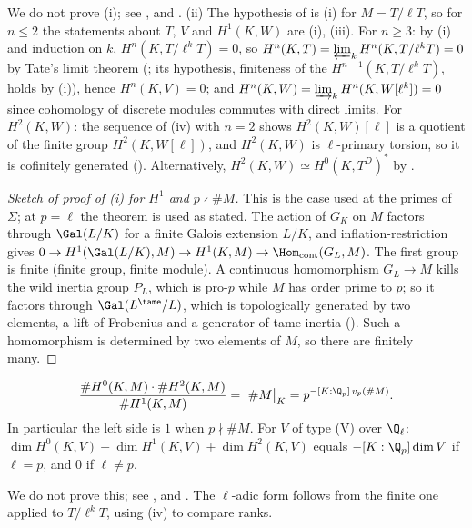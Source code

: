 \noindent We do not prove (i); see \cite[Chapter II, Section 5]{SerreGaloisCoh}, \cite[Chapter VII, Section 2]{NSW} and \cite[Chapter I, Section 2]{MilneADT}.
(ii) The hypothesis of  is (i) for $M=T/\ell T$, so for $n\le2$ the statements about $T$, $V$ and $H^1(K,W)$ are (i), (iii).
For $n\ge3$: by (i) and induction on $k$, $H^n(K,T/\ell^kT)=0$, so $H^n(K,T)=\varprojlim_kH^n(K,T/\ell^kT)=0$ by Tate's limit theorem (;
its hypothesis, finiteness of the $H^{n-1}(K,T/\ell^kT)$, holds by (i)), hence $H^n(K,V)=0$; and $H^n(K,W)=\varinjlim_kH^n(K,W[\ell^k])=0$ since cohomology of
discrete modules commutes with direct limits. For $H^2(K,W)$: the sequence of (iv) with $n=2$ shows $H^2(K,W)[\ell]$ is a quotient of the finite
group $H^2(K,W[\ell])$, and $H^2(K,W)$ is $\ell$-primary torsion, so it is cofinitely generated (). Alternatively, $H^2(K,W)\simeq H^0(K,T^D)^*$
by .

\begin{proof}[Sketch of proof of (i) for $H^1$ and $p\nmid\#M$]
This is the case used at the primes of $\Sigma$; at $p=\ell$ the theorem is used as stated. The action of $G_K$ on $M$ factors through $\Gal(L/K)$ for a finite Galois extension $L/K$, and inflation-restriction gives
$0\to H^1(\Gal(L/K),M)\to H^1(K,M)\to\Hom_{\mathrm{cont}}(G_L,M)$. The first group is finite (finite group, finite module). A continuous homomorphism $G_L\to M$ kills
the wild inertia group $P_L$, which is pro-$p$ while $M$ has order prime to $p$; so it factors through $\Gal(L^{\tame}/L)$, which is topologically generated by two
elements, a lift of Frobenius and a generator of tame inertia (). Such a homomorphism is determined by two elements of $M$, so there are finitely
many.
\end{proof}

\begin{theorem}\label{thm:galcoh:local-euler}
\[
\frac{\#H^0(K,M)\cdot\#H^2(K,M)}{\#H^1(K,M)}=\bigl|\#M\bigr|_K=p^{-[K:\Q_p]\,v_p(\#M)} .
\]
In particular the left side is $1$ when $p\nmid\#M$. For $V$ of type (V) over $\Q_\ell$: $\dim H^0(K,V)-\dim H^1(K,V)+\dim H^2(K,V)$ equals $-[K:\Q_p]\dim V$ if $\ell=p$,
and $0$ if $\ell\ne p$.
\end{theorem}

\noindent We do not prove this; see \cite[Chapter II, Section 5]{SerreGaloisCoh}, \cite[Chapter I, Section 2]{MilneADT} and \cite[Chapter VII, Section 3]{NSW}. The
$\ell$-adic form follows from the finite one applied to $T/\ell^kT$, using (iv) to compare ranks.

